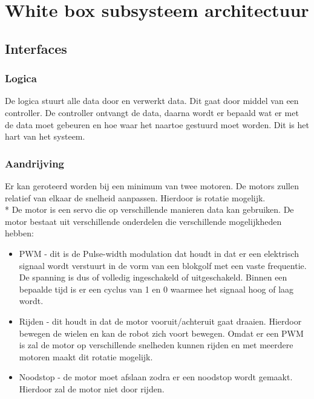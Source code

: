 \documentclass[12pt]{article} %
\begin{document}
\section{White box subsysteem architectuur}
\label{sec:conclusion}

\subsection{Interfaces}
\subsubsection{Logica}
De logica stuurt alle data door en verwerkt data. Dit gaat door middel van een controller. De controller ontvangt de data, daarna wordt er bepaald wat er met de data moet gebeuren en hoe waar het naartoe gestuurd moet worden. Dit is het hart van het systeem.

\subsubsection{Aandrijving}
Er kan geroteerd worden bij een minimum van twee motoren. De motors zullen relatief van elkaar de snelheid aanpassen. Hierdoor is rotatie mogelijk.	\\*
De motor is een servo die op verschillende manieren data kan gebruiken. De motor bestaat uit verschillende onderdelen die verschillende mogelijkheden hebben:
\begin{itemize}
\item PWM - dit is de Pulse-width modulation dat houdt in dat er een elektrisch signaal wordt verstuurt in de vorm van een blokgolf met een vaste frequentie. De spanning is dus of volledig ingeschakeld of uitgeschakeld. Binnen een bepaalde tijd is er een cyclus van 1 en 0 waarmee het signaal hoog of laag wordt.
\item Rijden - dit houdt in dat de motor vooruit/achteruit gaat draaien. Hierdoor bewegen de wielen en kan de robot zich voort bewegen. Omdat er een PWM is zal de motor op verschillende snelheden kunnen rijden en met meerdere motoren maakt dit rotatie mogelijk.
\item Noodstop - de motor moet afslaan zodra er een noodstop wordt gemaakt. Hierdoor zal de motor niet door rijden.
\end{itemize}
\end{document}
